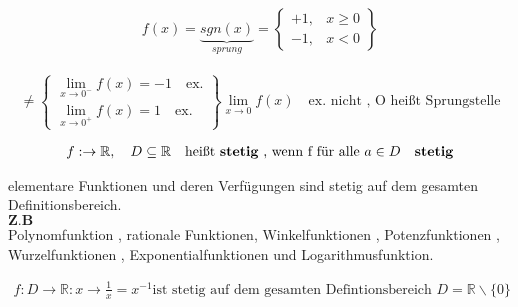 \begin{example}


$$
f(x) = \underbrace{sgn(x)}_{sprung}  =  \left\{\begin{array}{lr}
       + 1 , & x \geq 0\\
        -1 , & x < 0 
        \end{array}\right\} 
$$
\\
$$
\neq \left\{\begin{array}{lr}
  \lim\limits_{x \rightarrow 0^-}{f(x)} = -1 \quad \text{ex.} \\
        \lim\limits_{x \rightarrow 0^+}{f(x)} = 1 \quad \text{ex.} 
        \end{array}\right\} \lim\limits_{x \rightarrow 0}{f(x)} \quad \text{ex. nicht , O heißt Sprungstelle}
$$  
\end{example}

\begin{definition}
\begin{align*}
f : \rightarrow \mathbb{R} , \quad D \subseteq \mathbb{R} \quad \text{heißt \textbf{stetig} , wenn f für alle } a \in D \quad \textbf{stetig} 
\end{align*}
\end{definition}
\newpage
\begin{example}
elementare Funktionen und deren Verfügungen sind stetig auf dem gesamten Definitionsbereich. \\
$\textbf{Z.B}$ \\
Polynomfunktion , rationale Funktionen, Winkelfunktionen , Potenzfunktionen , Wurzelfunktionen , Exponentialfunktionen und Logarithmusfunktion.
     
\end{example}

\begin{example}
\begin{align*}
f : D \rightarrow \mathbb{R} : x \rightarrow \frac{1}{x} = x^{-1} \text{ist stetig auf dem gesamten  Defintionsbereich } D = \mathbb{R}   \backslash \{0\}  
\end{align*}
\end{example}

